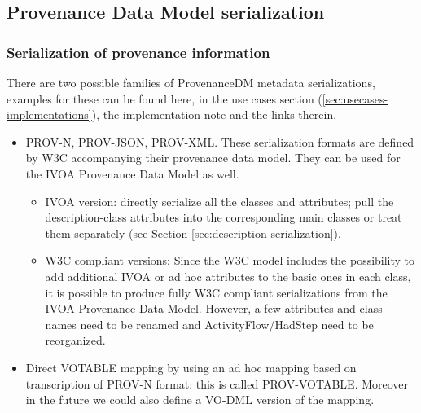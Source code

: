 \subsection{Provenance Data Model serialization}\label{sec:serialisations}


\subsubsection{Serialization of provenance information}

There are two possible families of ProvenanceDM metadata serializations, examples for these can be found here, in the use cases section (\ref{sec:usecases-implementations}), the implementation note \citep[]{std:ProvenanceImplementationNote} and the links therein.

\begin{itemize}

\item PROV-N, PROV-JSON, PROV-XML.
These serialization formats are defined by W3C accompanying their provenance data model. They can be used for the IVOA Provenance Data Model as well.
\begin{itemize}
\item IVOA version: directly serialize all the classes and attributes; pull the description-class attributes into the corresponding main classes or treat them separately (see Section \ref{sec:description-serialization}).
\item W3C compliant versions: Since the W3C model includes the possibility to add additional IVOA or ad hoc attributes to the basic ones in each class, it is possible to produce fully W3C compliant serializations from the IVOA Provenance Data Model. However, a few attributes and class names need to be renamed and ActivityFlow/HadStep need to be reorganized.
\end{itemize}


\item Direct VOTABLE mapping by using an ad hoc mapping based on transcription of PROV-N format: this is called PROV-VOTABLE. Moreover in the future we could also define a VO-DML \citep{std:VODML} version of the mapping.

\end{itemize}

